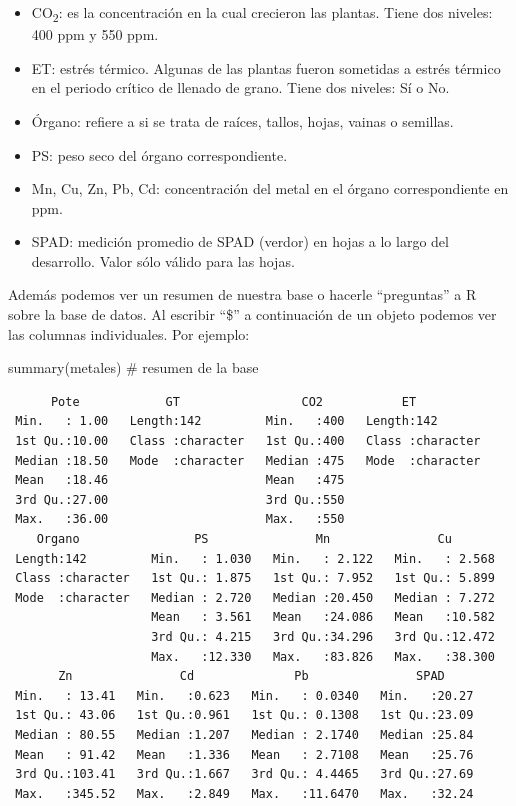 \documentclass[
  letterpaper,
  DIV=11,
  numbers=noendperiod]{scrartcl}
\newenvironment{Shaded}{\begin{snugshade}}{\end{snugshade}}
\newcommand{\CommentTok}[1]{\textcolor[rgb]{0.37,0.37,0.37}{#1}}
\newcommand{\FunctionTok}[1]{\textcolor[rgb]{0.28,0.35,0.67}{#1}}
\newcommand{\NormalTok}[1]{\textcolor[rgb]{0.00,0.23,0.31}{#1}}
\begin{document}
\begin{itemize}
\item
  CO\textsubscript{2}: es la concentración en la cual crecieron las
  plantas. Tiene dos niveles: 400 ppm y 550 ppm.
\item
  ET: estrés térmico. Algunas de las plantas fueron sometidas a estrés
  térmico en el periodo crítico de llenado de grano. Tiene dos niveles:
  Sí o No.
\item
  Órgano: refiere a si se trata de raíces, tallos, hojas, vainas o
  semillas.
\item
  PS: peso seco del órgano correspondiente.
\item
  Mn, Cu, Zn, Pb, Cd: concentración del metal en el órgano
  correspondiente en ppm.
\item
  SPAD: medición promedio de SPAD (verdor) en hojas a lo largo del
  desarrollo. Valor sólo válido para las hojas.
\end{itemize}

Además podemos ver un resumen de nuestra base o hacerle ``preguntas'' a
R sobre la base de datos. Al escribir ``\$'' a continuación de un objeto
podemos ver las columnas individuales. Por ejemplo:

\begin{Shaded}
\begin{Highlighting}[]
\FunctionTok{summary}\NormalTok{(metales) }\CommentTok{\# resumen de la base}
\end{Highlighting}
\end{Shaded}

\begin{verbatim}
      Pote            GT                 CO2           ET           
 Min.   : 1.00   Length:142         Min.   :400   Length:142        
 1st Qu.:10.00   Class :character   1st Qu.:400   Class :character  
 Median :18.50   Mode  :character   Median :475   Mode  :character  
 Mean   :18.46                      Mean   :475                     
 3rd Qu.:27.00                      3rd Qu.:550                     
 Max.   :36.00                      Max.   :550                     
    Organo                PS               Mn               Cu        
 Length:142         Min.   : 1.030   Min.   : 2.122   Min.   : 2.568  
 Class :character   1st Qu.: 1.875   1st Qu.: 7.952   1st Qu.: 5.899  
 Mode  :character   Median : 2.720   Median :20.450   Median : 7.272  
                    Mean   : 3.561   Mean   :24.086   Mean   :10.582  
                    3rd Qu.: 4.215   3rd Qu.:34.296   3rd Qu.:12.472  
                    Max.   :12.330   Max.   :83.826   Max.   :38.300  
       Zn               Cd              Pb               SPAD      
 Min.   : 13.41   Min.   :0.623   Min.   : 0.0340   Min.   :20.27  
 1st Qu.: 43.06   1st Qu.:0.961   1st Qu.: 0.1308   1st Qu.:23.09  
 Median : 80.55   Median :1.207   Median : 2.1740   Median :25.84  
 Mean   : 91.42   Mean   :1.336   Mean   : 2.7108   Mean   :25.76  
 3rd Qu.:103.41   3rd Qu.:1.667   3rd Qu.: 4.4465   3rd Qu.:27.69  
 Max.   :345.52   Max.   :2.849   Max.   :11.6470   Max.   :32.24  
\end{verbatim}
\end{document}
